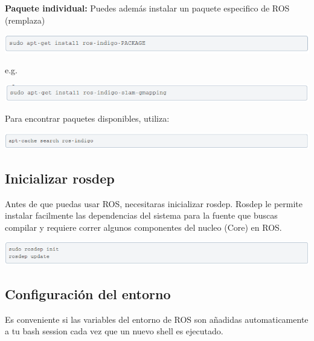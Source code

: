 \documentclass[a4paper]{book}
\begin{document}
\textbf{Paquete individual:} Puedes además instalar un paquete especifico de ROS (remplaza)

\begin{center}
\includegraphics[width=1.2\textwidth]{Figures/Software/Install_ROS/Paso_10.png}
\end{center}

e.g.

\begin{center}
\includegraphics[width=1.2\textwidth]{Figures/Software/Install_ROS/Paso_11.png}
\end{center}

Para encontrar paquetes disponibles, utiliza:

\begin{center}
\includegraphics[width=1.2\textwidth]{Figures/Software/Install_ROS/Paso_12.png}
\end{center}

\subsection{Inicializar rosdep}
Antes de que puedas usar ROS, necesitaras inicializar rosdep. Rosdep le permite instalar facilmente las dependencias del sistema para la fuente que buscas compilar y requiere correr algunos componentes del nucleo (Core) en ROS.

\begin{center}
\includegraphics[width=1.2\textwidth]{Figures/Software/Install_ROS/Paso_13.png}
\end{center}

\subsection{Configuración del entorno}

Es conveniente si las variables del entorno de ROS son añadidas automaticamente a tu bash session cada vez que un nuevo shell es ejecutado. 
\end{document}

